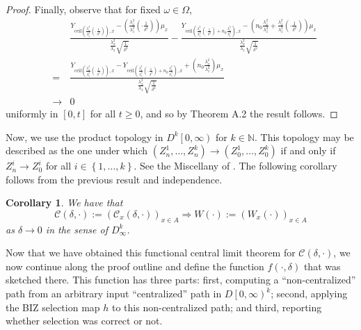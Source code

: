 \documentclass{wscpaperproc}
\theoremstyle{wsc}
\newtheorem{corollary}{Corollary}
\begin{document}
\begin{proof}
Finally, observe that for fixed $\omega\in\Omega$,
\begin{eqnarray*}
 &  & \frac{Y_{\mbox{ceil}\left(\frac{\lambda_{x}^{2}}{\lambda_{z}^{2}}\left(\cdot\frac{1}{\delta^{2}}\right)\right),x}-\mbox{}\left(\frac{\lambda_{x}^{2}}{\lambda_{z}^{2}}\left(\cdot\frac{1}{\delta^{2}}\right)\right)\mu_{x}}{\frac{\lambda_{x}^{2}}{\lambda_{z}}\sqrt{\frac{1}{\delta^{2}}}}-\frac{Y_{\mbox{ceil}\left(\frac{\lambda_{x}^{2}}{\lambda_{z}^{2}}\left(\cdot\frac{1}{\delta^{2}}\right)+n_{0}\frac{\lambda_{x}^{2}}{\lambda_{z}^{2}}\right),x}-\mbox{}\left(n_{0}\frac{\lambda_{x}^{2}}{\lambda_{z}^{2}}+\frac{\lambda_{x}^{2}}{\lambda_{z}^{2}}\left(\cdot\frac{1}{\delta^{2}}\right)\right)\mu_{x}}{\frac{\lambda_{x}^{2}}{\lambda_{z}}\sqrt{\frac{1}{\delta^{2}}}}\\
 & = & \frac{Y_{\mbox{ceil}\left(\frac{\lambda_{x}^{2}}{\lambda_{z}^{2}}\left(\cdot\frac{1}{\delta^{2}}\right)\right),x}-Y_{\mbox{ceil}\left(\frac{\lambda_{x}^{2}}{\lambda_{z}^{2}}\left(\cdot\frac{1}{\delta^{2}}\right)+n_{0}\frac{\lambda_{x}^{2}}{\lambda_{z}^{2}}\right),x}+\left(n_{0}\frac{\lambda_{x}^{2}}{\lambda_{z}^{2}}\right)\mu_{x}}{\frac{\lambda_{x}^{2}}{\lambda_{z}}\sqrt{\frac{1}{\delta^{2}}}}\\
 & \rightarrow & 0
\end{eqnarray*}
uniformly in $\left[0,t\right]$ for all $t\geq0$, and so by Theorem
A.2 the result follows.

\end{proof}


Now, we use the product topology in $D^{k}\left[0,\infty\right)$
for $k\in\mathbb{N}$. This topology may be described as the one under
which $\left(Z_{n}^{1},\ldots,Z_{n}^{k}\right)\rightarrow\left(Z_{0}^{1},\ldots,Z_{0}^{k}\right)$
if and only if $Z_{n}^{i}\rightarrow Z_{0}^{i}$ for all $i\in\left\{ 1,\ldots,k\right\} $.
See the Miscellany of  . The following corollary follows
from the previous result and independence.


\begin{corollary}
    \label{cor:CLT}
We have that
\[
\mathcal{C}\left(\delta,\cdot\right):=\left(\mathcal{C}_{x}\left(\delta,\cdot\right)\right)_{x\in A}\Rightarrow W\left(\cdot\right):=\left(W_{x}\left(\cdot\right)\right)_{x\in A}
\]
as $\delta\rightarrow0$ in the sense of $D_{\infty}^{k}$.
\end{corollary}


Now that we have obtained this functional central limit theorem for 
$\mathcal{C}\left(\delta,\cdot\right)$, we now continue along the proof outline and define the function $f(\cdot,\delta)$ that was sketched there.
This function has three parts: first, computing a ``non-centralized'' path from an arbitrary input ``centralized'' path in $D\left[0,\infty\right)^{k}$; second, applying the BIZ selection map $h$ to this non-centralized path; and third, reporting whether selection was correct or not.
\end{document}
